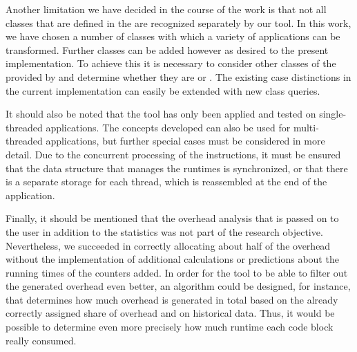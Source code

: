 Another limitation we have decided in the course of the work is that not all classes that are defined in the \CLANG \astsmall are recognized separately by our tool. In this work, we have chosen a number of classes with which a variety of applications can be transformed. Further classes can be added however as desired to the present implementation. To achieve this it is necessary to consider other classes of the \astsmall provided by \CLANG and determine whether they are \LEASTAS or \PARSTAS. The existing case distinctions in the current implementation can easily be extended with new class queries. 

It should also be noted that the tool has only been applied and tested on single-threaded applications. The concepts developed can also be used for multi-threaded applications, but further special cases must be considered in more detail. Due to the concurrent processing of the instructions, it must be ensured that the data structure that manages the runtimes is synchronized, or that there is a separate storage for each thread, which is reassembled at the end of the application. 

Finally, it should be mentioned that the overhead analysis that is passed on to the user in addition to the statistics was not part of the research objective. Nevertheless, we succeeded in correctly allocating about half of the overhead without the implementation of additional calculations or predictions about the running times of the counters added. In order for the tool to be able to filter out the generated overhead even better, an algorithm could be designed, for instance, that determines how much overhead is generated in total based on the already correctly assigned share of overhead and on historical data. Thus, it would be possible to determine even more precisely how much runtime each code block really consumed. 